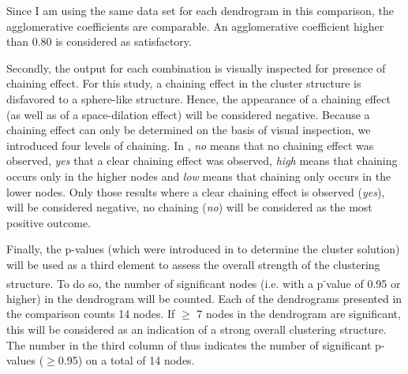 Since I am using the same data set for each dendrogram in this comparison, the agglomerative coefficients are comparable. An agglomerative coefficient higher than 0.80 is considered as satisfactory.

Secondly, the output for each combination is visually inspected for presence of chaining effect. For this study, a chaining effect in the cluster structure is disfavored to a sphere-like structure. Hence, the appearance of a chaining effect (as well as of a space-dilation effect) will be considered negative. Because a chaining effect can only be determined on the basis of visual inspection, we introduced four levels of chaining. In , \textit{no} means that no chaining effect was observed, \textit{yes} that a clear chaining effect was observed, \textit{high} means that chaining occurs only in the higher nodes and \textit{low} means that chaining only occurs in the lower nodes. Only those results where a clear chaining effect is observed (\textit{yes}), will be considered negative, no chaining (\textit{no}) will be considered as the most positive outcome.

Finally, the p-values (which were introduced in  to determine the cluster solution) will be used as a third element to assess the overall strength of the clustering structure. To do so, the number of significant nodes (i.e. with a p\textsuperscript{{}-}value of 0.95 or higher) in the dendrogram will be counted. Each of the dendrograms presented in the comparison counts 14 nodes. If ${\geq}$ 7 nodes in the dendrogram are significant, this will be considered as an indication of a strong overall clustering structure. The number in the third column of  thus indicates the number of significant p-values (${\geq}$0.95) on a total of 14 nodes.

